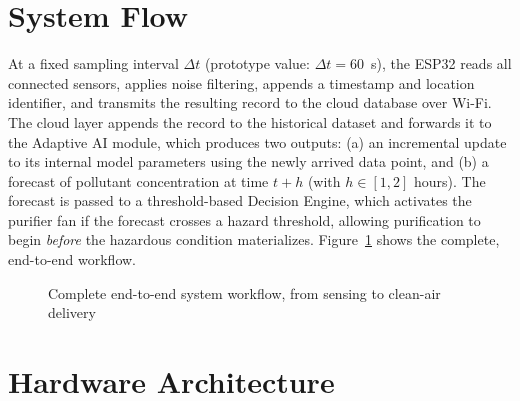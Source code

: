 \section{System Flow}
\label{sec:meth-system-flow}

At a fixed sampling interval $\Delta t$ (prototype value: $\Delta t = 60$~s), the ESP32 reads all connected sensors, applies noise filtering, appends a timestamp and location identifier, and transmits the resulting record to the cloud database over Wi-Fi. The cloud layer appends the record to the historical dataset and forwards it to the Adaptive AI module, which produces two outputs: (a) an incremental update to its internal model parameters using the newly arrived data point, and (b) a forecast of pollutant concentration at time $t+h$ (with $h \in [1,2]$ hours). The forecast is passed to a threshold-based Decision Engine, which activates the purifier fan if the forecast crosses a hazard threshold, allowing purification to begin \emph{before} the hazardous condition materializes. Figure~\ref{fig:workflow} shows the complete, end-to-end workflow.

\begin{figure}[htbp]
\centering
{}
\caption{Complete end-to-end system workflow, from sensing to clean-air delivery}
\label{fig:workflow}
\end{figure}

\FloatBarrier

\section{Hardware Architecture}
\label{sec:meth-hardware}

